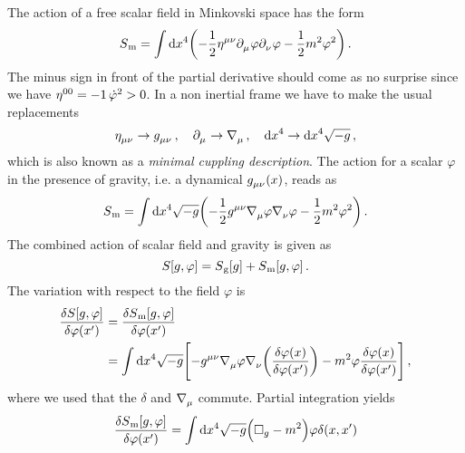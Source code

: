 \begin{example}
The action of a free scalar field in Minkovski space has the form
\begin{equation}
S\textsubscript{m}=\int \dif x^4 \left(-\frac{1}{2}\tensor{\eta}{^\mu^\nu}
\tensor{\partial}{_\mu}\varphi\tensor{\partial}{_\nu}\varphi-\frac{1}{2}m^2\varphi^2\right)\,.
\end{equation}
The minus sign in front of the partial derivative should come as no surprise
since we have $\tensor{\eta}{^0^0}=-1\, \dot{\varphi}^2>0$. In a non inertial
frame we have to make the usual replacements
\begin{equation}
\tensor{\eta}{_\mu_\nu}\to \tensor{g}{_\mu_\nu}\, , \quad
\tensor{\partial}{_\mu}\to
\tensor{\nabla}{_\mu}\,, \quad \dif x^4\to \dif x^4\sqrt{-g}\, ,
\end{equation}
which is also known as a \emph{minimal cuppling description}. The action for a
scalar $\varphi$ in the presence of gravity, 
i.e. a dynamical $\tensor{g}{_\mu_\nu}(x)$, reads as
\begin{equation}
S\textsubscript{m}=\int \dif x^4 \sqrt{-g}\left(-\frac{1}{2}\tensor{g}{^\mu^\nu}
\tensor{\nabla}{_\mu}\varphi\tensor{\nabla}{_\nu}\varphi
-\frac{1}{2}m^2\varphi^2\right)\,.
\end{equation}
 The combined action of scalar field and
gravity is given as
\begin{equation}
S[g,\varphi]=S\textsubscript{g}[g]+S\textsubscript{m}[g,\varphi]\,.
\end{equation}
The variation with respect to the field $\varphi$ is 
\begin{equation}
\begin{split}
\frac{\delta S[g,\varphi]}{\delta
\varphi\left(x'\right)}&=\frac{\delta S\textsubscript{m}[g,\varphi]}{\delta
\varphi\left(x'\right)}\\
&=\int \dif x^4\sqrt{-g}\left[-\tensor{g}{^\mu^\nu}
\tensor{\nabla}{_\mu}\varphi\tensor{\nabla}{_\nu}\left(\frac{\delta
\varphi(x)}{\delta \varphi\left(x'\right)}\right)-m^2\varphi\frac{\delta
\varphi(x)}{\delta \varphi\left(x'\right)}\right]\,,
\end{split}
\end{equation}
where we used that the $\delta$ and $\tensor{\nabla}{_\mu}$ commute. Partial
integration yields
\begin{equation}
\begin{split}
\frac{\delta S\textsubscript{m}[g,\varphi]}{\delta \varphi\left(x'\right)}&=\int
\dif
x^4\sqrt{-g}\left(\square_{g}-m^2\right)\varphi\delta(x,x')\\

\end{split}
\end{equation}
\end{example}
